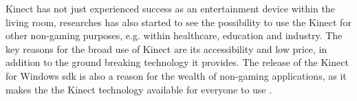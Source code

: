 Kinect has not just experienced success as an entertainment device within the living room, researches has also started to see the possibility to use the Kinect for other non-gaming purposes, e.g. within healthcare, education and industry. The key reasons for the broad use of Kinect are its accessibility and low price, in addition to the ground breaking technology it provides. The release of the Kinect for Windows \ac{sdk} is also a reason for the wealth of non-gaming applications, as it makes the the Kinect technology available for everyone to use \cite{microsoftnews}. 


